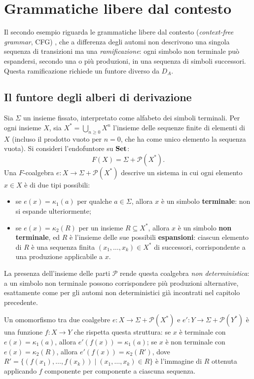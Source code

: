 \section{Grammatiche libere dal contesto}

Il secondo esempio riguarda le grammatiche libere dal contesto (\textit{context-free grammar}, CFG) \cite{hopcroft2006,aho1986}, che a differenza degli automi non descrivono una singola sequenza di transizioni ma una \textit{ramificazione}: ogni simbolo non terminale può espandersi, secondo una o più produzioni, in una sequenza di simboli successori. Questa ramificazione richiede un funtore diverso da \(D_A\).

\subsection{Il funtore degli alberi di derivazione}

Sia \(\Sigma\) un insieme fissato, interpretato come alfabeto dei simboli terminali. Per ogni insieme \(X\), sia \(X^* = \bigcup_{n \geq 0} X^n\) l'insieme delle sequenze finite di elementi di \(X\) (incluso il prodotto vuoto per \(n=0\), che ha come unico elemento la sequenza vuota). Si consideri l'endofuntore su \(\operatorname{\mathbf{Set}}\):
\[
  F(X) = \Sigma + \mathcal{P}(X^*).
\]
Una \(F\)-coalgebra \(e : X \to \Sigma + \mathcal{P}(X^*)\) descrive un sistema in cui ogni elemento \(x \in X\) è di due tipi possibili:
\begin{itemize}
  \item se \(e(x) = \kappa_1(a)\) per qualche \(a \in \Sigma\), allora \(x\) è un simbolo \textbf{terminale}: non si espande ulteriormente;
  \item se \(e(x) = \kappa_2(R)\) per un insieme \(R \subseteq X^*\), allora \(x\) è un simbolo \textbf{non terminale}, ed \(R\) è l'insieme delle sue possibili \textbf{espansioni}: ciascun elemento di \(R\) è una sequenza finita \((x_1, \ldots, x_k) \in X^*\) di successori, corrispondente a una produzione applicabile a \(x\).
\end{itemize}
La presenza dell'insieme delle parti \(\mathcal{P}\) rende questa coalgebra \textit{non deterministica}: a un simbolo non terminale possono corrispondere più produzioni alternative, esattamente come per gli automi non deterministici già incontrati nel capitolo precedente.

Un omomorfismo tra due coalgebre \(e : X \to \Sigma + \mathcal{P}(X^*)\) e \(e' : Y \to \Sigma + \mathcal{P}(Y^*)\) è una funzione \(f : X \to Y\) che rispetta questa struttura: se \(x\) è terminale con \(e(x) = \kappa_1(a)\), allora \(e'(f(x)) = \kappa_1(a)\); se \(x\) è non terminale con \(e(x) = \kappa_2(R)\), allora \(e'(f(x)) = \kappa_2(R')\), dove \(R' = \{(f(x_1), \ldots, f(x_k)) \mid (x_1, \ldots, x_k) \in R\}\) è l'immagine di \(R\) ottenuta applicando \(f\) componente per componente a ciascuna sequenza.

